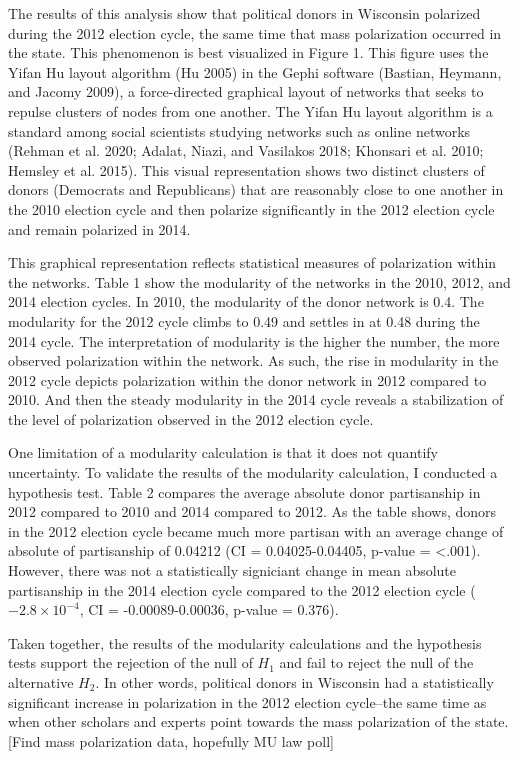 \documentclass[12pt,]{article}
\begin{document}
The results of this analysis show that political donors in Wisconsin
polarized during the 2012 election cycle, the same time that mass
polarization occurred in the state. This phenomenon is best visualized
in Figure 1. This figure uses the Yifan Hu layout algorithm (Hu 2005) in
the Gephi software (Bastian, Heymann, and Jacomy 2009), a force-directed
graphical layout of networks that seeks to repulse clusters of nodes
from one another. The Yifan Hu layout algorithm is a standard among
social scientists studying networks such as online networks (Rehman et
al. 2020; Adalat, Niazi, and Vasilakos 2018; Khonsari et al. 2010;
Hemsley et al. 2015). This visual representation shows two distinct
clusters of donors (Democrats and Republicans) that are reasonably close
to one another in the 2010 election cycle and then polarize
significantly in the 2012 election cycle and remain polarized in 2014.

This graphical representation reflects statistical measures of
polarization within the networks. Table 1 show the modularity of the
networks in the 2010, 2012, and 2014 election cycles. In 2010, the
modularity of the donor network is 0.4. The modularity for the 2012
cycle climbs to 0.49 and settles in at 0.48 during the 2014 cycle. The
interpretation of modularity is the higher the number, the more observed
polarization within the network. As such, the rise in modularity in the
2012 cycle depicts polarization within the donor network in 2012
compared to 2010. And then the steady modularity in the 2014 cycle
reveals a stabilization of the level of polarization observed in the
2012 election cycle.

One limitation of a modularity calculation is that it does not quantify
uncertainty. To validate the results of the modularity calculation, I
conducted a hypothesis test. Table 2 compares the average absolute donor
partisanship in 2012 compared to 2010 and 2014 compared to 2012. As the
table shows, donors in the 2012 election cycle became much more partisan
with an average change of absolute of partisanship of 0.04212 (CI =
0.04025-0.04405, p-value = \textless.001). However, there was not a
statistically signiciant change in mean absolute partisanship in the
2014 election cycle compared to the 2012 election cycle
(\ensuremath{-2.8\times 10^{-4}}, CI = -0.00089-0.00036, p-value =
0.376).

Taken together, the results of the modularity calculations and the
hypothesis tests support the rejection of the null of \(H_{1}\) and fail
to reject the null of the alternative \(H_{2}\). In other words,
political donors in Wisconsin had a statistically significant increase
in polarization in the 2012 election cycle--the same time as when other
scholars and experts point towards the mass polarization of the state.
{[}Find mass polarization data, hopefully MU law poll{]}
\end{document}
